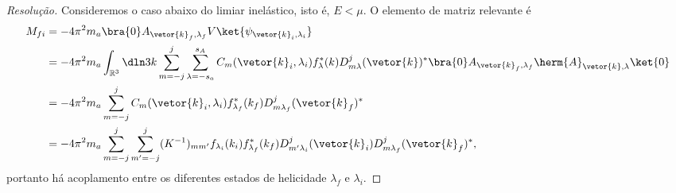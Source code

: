 \begin{proof}[Resolução]
   Consideremos o caso abaixo do limiar inelástico, isto é, \(E < \mu\). O elemento de matriz relevante é
   \begin{align*}
      M_{fi} &= -4\pi^2 m_a \bra{0} A_{\vetor{k}_f,\lambda_f} V \ket{\psi_{\vetor{k}_i, \lambda_i}}\\
             &= -4\pi^2 m_a \int_{\mathbb{R}^3} \dln3k \sum_{m = -j}^{j} \sum_{\lambda = -s_a}^{s_A} C_m(\vetor{k}_i,\lambda_i) f_\lambda^*(k) D^j_{m\lambda}(\vetor{k})^* \bra{0} A_{\vetor{k}_f,\lambda_f} \herm{A}_{\vetor{k}, \lambda} \ket{0}\\
             &= -4\pi^2 m_a \sum_{m = -j}^{j} C_m(\vetor{k}_i, \lambda_i) f_{\lambda_f}^*(k_f) D^{j}_{m \lambda_f}(\vetor{k}_f)^*\\
             &= -4\pi^2 m_a \sum_{m = -j}^{j} \sum_{m' = -j}^{j} (K^{-1})_{mm'} f_{\lambda_i}(k_i) f_{\lambda_f}^*(k_f) D^{j}_{m' \lambda_i}(\vetor{k}_i)D^{j}_{m \lambda_f}(\vetor{k}_f)^*,
   \end{align*}
   portanto há acoplamento entre os diferentes estados de helicidade \(\lambda_f\) e \(\lambda_i.\) \todo[Paridade]
\end{proof}
